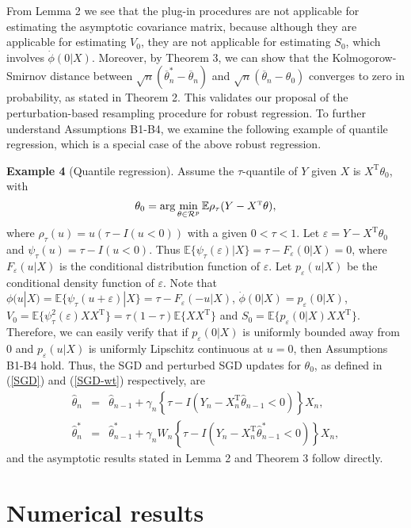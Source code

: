 \documentclass[twoside,11pt]{article}
\def\arg{\mathop{\rm arg}}
\def\trans{^{ \mathrm{\scriptscriptstyle T} }}
\def\wh{\widehat}
\def\ol{\overline}
\begin{document}
From Lemma 2 we see that the plug-in procedures are not applicable for estimating the asymptotic covariance matrix, because although they are applicable for estimating $V_0$, they are not applicable for estimating $S_0$, which involves $\dot{\phi}(0|X)$. Moreover, by Theorem 3, we can show that the Kolmogorow-Smirnov distance between $\sqrt{n}(\ol{\theta}^*_n-\ol{\theta}_n)$ and $\sqrt{n}(\ol{\theta}_n-\theta_0)$ converges to zero in probability, as stated in Theorem 2. This validates our proposal of the perturbation-based resampling procedure for robust regression. To further understand Assumptions B1-B4, we examine the following example of quantile regression, which is a special case of the above robust regression.

{\bf Example 4} (Quantile regression). Assume the $\tau$-quantile of $Y$ given $X$ is $X\trans\theta_0$, with
\begin{equation}
\theta_0=\arg\min_{\theta\in\mathcal{R}^p}\mathbb{E} \rho_{\tau}(Y-X\trans\theta),\label{eq-qr}
\end{equation}
where $\rho_\tau(u)=u(\tau-I(u<0))$ with a given $0<\tau<1$. Let $\varepsilon=Y-X\trans\theta_0$ and $\psi_{\tau}(u)=\tau-I(u<0)$. Thus $\mathbb{E}\{\psi_{\tau}(\varepsilon)|X\}=\tau-F_{\varepsilon}(0|X)=0$, where $F_{\varepsilon}(u|X)$ is the conditional distribution function of $\varepsilon$. Let $p_{\varepsilon}(u|X)$ be the conditional density function of $\varepsilon$. Note that $\phi(u|X)=\mathbb{E}\{\psi_{\tau}(u+\varepsilon)|X\}=\tau-F_{\varepsilon}(-u|X)$, $\dot{\phi}(0|X)=p_{\varepsilon}(0|X)$, $V_0=\mathbb{E}\{\psi^2_{\tau}(\varepsilon)XX\trans\}=\tau(1-\tau)\mathbb{E}\{XX\trans\}$ and $S_0=\mathbb{E}\{p_{\varepsilon}(0|X)XX\trans\}$. Therefore, we can easily verify that if $p_{\varepsilon}(0|X)$ is uniformly bounded away from 0 and $p_{\varepsilon}(u|X)$ is uniformly Lipschitz continuous at $u=0$, then Assumptions B1-B4 hold. Thus, the SGD and perturbed SGD updates for $\theta_0$, as defined in (\ref{SGD}) and (\ref{SGD-wt}) respectively, are
\begin{eqnarray}
\wh{\theta}_n&=&\wh{\theta}_{n-1}+\gamma_n\left\{\tau-I(Y_n-X_n\trans\wh{\theta}_{n-1}<0)\right\}X_n,\label{eg4-sgd}\\
\wh{\theta}^*_n&=&\wh{\theta}^*_{n-1}+\gamma_nW_n\left\{\tau-I(Y_n-X_n\trans\wh{\theta}^*_{n-1}<0)\right\}X_n,\label{eg4-sgd-rw}
\end{eqnarray}
and the asymptotic results stated in Lemma 2 and Theorem 3 follow directly.

\section{Numerical results}
\end{document}
